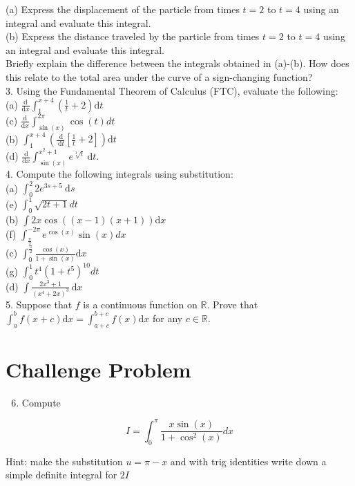\documentclass[10pt]{article}
\begin{document}
(a) Express the displacement of the particle from times $t=2$ to $t=4$ using an integral and evaluate this integral.\\
(b) Express the distance traveled by the particle from times $t=2$ to $t=4$ using an integral and evaluate this integral.\\
Briefly explain the difference between the integrals obtained in (a)-(b). How does this relate to the total area under the curve of a sign-changing function?\\
3. Using the Fundamental Theorem of Calculus (FTC), evaluate the following:\\
(a) $\frac{\mathrm{d}}{\mathrm{d} x} \int_{1}^{x+4}\left(\frac{1}{t}+2\right) \mathrm{d} t$\\
(c) $\frac{\mathrm{d}}{\mathrm{d} x} \int_{\sin (x)}^{2 \pi} \cos (t) d t$\\
(b) $\int_{1}^{x+4}\left(\frac{\mathrm{~d}}{\mathrm{~d} t}\left[\frac{1}{t}+2\right]\right) \mathrm{d} t$\\
(d) $\frac{\mathrm{d}}{\mathrm{d} x} \int_{\sin (x)}^{x^{2}+1} e^{\sqrt[3]{t}} \mathrm{~d} t$.\\
4. Compute the following integrals using substitution:\\
(a) $\int_{0}^{2} 2 e^{3 s+5} \mathrm{~d} s$\\
(e) $\int_{0}^{1} \sqrt{2 t+1} d t$\\
(b) $\int 2 x \cos ((x-1)(x+1)) \mathrm{d} x$\\
(f) $\int_{\frac{\pi}{2}}^{-2 \pi} e^{\cos (x)} \sin (x) d x$\\
(c) $\int_{0}^{\frac{\pi}{2}} \frac{\cos (x)}{1+\sin (x)} \mathrm{d} x$\\
(g) $\int_{0}^{1} t^{4}\left(1+t^{5}\right)^{10} d t$\\
(d) $\int \frac{2 x^{3}+1}{\left(x^{4}+2 x\right)^{3}} \mathrm{~d} x$\\
5. Suppose that $f$ is a continuous function on $\mathbb{R}$. Prove that $\int_{a}^{b} f(x+c) \mathrm{d} x=\int_{a+c}^{b+c} f(x) \mathrm{d} x$ for any $c \in \mathbb{R}$.

\section*{Challenge Problem}
\begin{enumerate}
  \setcounter{enumi}{5}
  \item Compute
\end{enumerate}

$$
I=\int_{0}^{\pi} \frac{x \sin (x)}{1+\cos ^{2}(x)} d x
$$

Hint: make the substitution $u=\pi-x$ and with trig identities write down a simple definite integral for $2 I$
\end{document}
